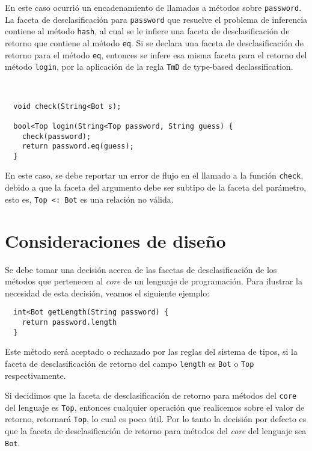 En este caso ocurrió un encadenamiento de llamadas a métodos sobre \texttt{password}. La faceta de desclasificación para \texttt{password} que resuelve el problema de inferencia contiene al método \texttt{hash}, al cual se le infiere una faceta de desclasificación de retorno que contiene al método \texttt{eq}. Si se declara una faceta de desclasificación de retorno para el método \texttt{eq}, entonces se infere esa misma faceta para el retorno del método \texttt{login}, por la aplicación de la regla \texttt{TmD} de type-based declassification.

\begin{ej} \ \\
  \normalfont
\begin{lstlisting}
  void check(String<Bot s);

  bool<Top login(String<Top password, String guess) {
    check(password);
    return password.eq(guess);
  }
\end{lstlisting}
\end{ej}

En este caso, se debe reportar un error de flujo en el llamado a la función \texttt{check}, debido a que la faceta del argumento debe ser subtipo de la faceta del parámetro, esto es, \texttt{Top <: Bot} es una relación no válida.

\section{Consideraciones de diseño}

Se debe tomar una decisión acerca de las facetas de desclasificación de los métodos que pertenecen al \textit{core} de un lenguaje de programación. Para ilustrar la necesidad de esta decisión, veamos el siguiente ejemplo:

\begin{lstlisting}
  int<Bot getLength(String password) {
    return password.length
  }
\end{lstlisting}

Este método será aceptado o rechazado por las reglas del sistema de tipos, si la faceta de desclasificación de retorno del campo \texttt{length} es \texttt{Bot} o \texttt{Top} respectivamente.

Si decidimos que la faceta de desclasificación de retorno para métodos del \texttt{core} del lenguaje es \texttt{Top}, entonces cualquier operación que realicemos sobre el valor de retorno, retornará \texttt{Top}, lo cual es poco útil. Por lo tanto la decisión por defecto es que la faceta de desclasificación de retorno para métodos del \textit{core} del lenguaje sea \texttt{Bot}.


